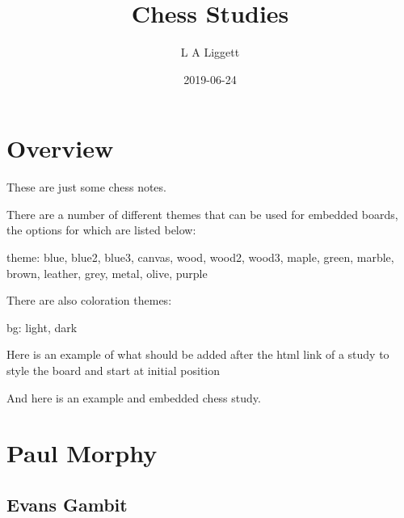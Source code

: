 \documentclass[]{book}
\title{Chess Studies}
\author{L A Liggett}
\date{2019-06-24}
\newenvironment{Shaded}{\begin{snugshade}}{\end{snugshade}}
\newcommand{\CommentTok}[1]{\textcolor[rgb]{0.56,0.35,0.01}{\textit{#1}}}
\newcommand{\OperatorTok}[1]{\textcolor[rgb]{0.81,0.36,0.00}{\textbf{#1}}}
\newcommand{\NormalTok}[1]{#1}
\begin{document}
\maketitle

{
\setcounter{tocdepth}{1}
\tableofcontents
}
\chapter{Overview}\label{overview}

These are just some chess notes.

There are a number of different themes that can be used for embedded
boards, the options for which are listed below:

\begin{Shaded}
\begin{Highlighting}[]
\NormalTok{theme: blue, blue2, blue3, canvas, wood, wood2, wood3, maple, green, marble, brown, leather, grey, metal, olive, purple}
\end{Highlighting}
\end{Shaded}

There are also coloration themes:

\begin{Shaded}
\begin{Highlighting}[]
\NormalTok{bg: light, dark}
\end{Highlighting}
\end{Shaded}

Here is an example of what should be added after the html link of a
study to style the board and start at initial position

\begin{Shaded}
\end{Shaded}

And here is an example and embedded chess study.

\chapter{Paul Morphy}\label{morphy}

\section{Evans Gambit}\label{evans-gambit}
\end{document}
